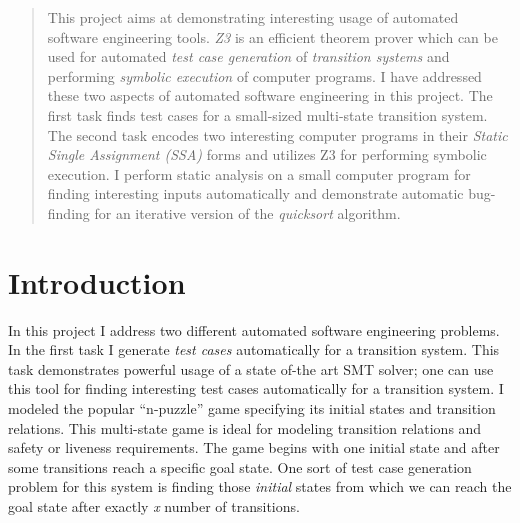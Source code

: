 \documentclass{sig-alternate-05-2015}
\begin{document}
\author{
%
%
\alignauthor
Shafiul Azam Chowdhury\\
       \\
       \\
}


\maketitle
\begin{abstract}
This project aims at demonstrating interesting usage of automated software 
engineering tools. \textit{Z3} is an efficient theorem prover \cite{DeMoura:Z3} which can be used 
for automated \textit{test case generation} of \textit{transition systems} and 
performing \textit{symbolic execution} \cite{King:SE} of computer programs. I have addressed these two aspects 
of automated software engineering in this project. The first task finds test cases for 
a small-sized multi-state transition system. The second task encodes two interesting 
computer programs in their \textit{Static Single Assignment (SSA)} \cite{Alpern:SSA} forms 
and utilizes Z3 for performing symbolic execution. I perform static analysis on a 
small computer program for finding interesting inputs automatically and demonstrate 
automatic bug-finding for an iterative version of the \textit{quicksort} algorithm. 
\end{abstract}



\section{Introduction}
In this project I address two different automated software engineering problems. In the first task I generate \textit{test cases} automatically for a transition system. This task demonstrates powerful usage of a state of-the art SMT solver; one can use this tool for finding interesting test cases automatically for a transition system. I modeled the popular ``n-puzzle'' game specifying its initial states and transition relations. This multi-state game is ideal for modeling transition relations and safety or liveness requirements. The game begins with one initial state and after some transitions reach a specific goal state. One sort of test case generation problem for this system is finding those \textit{initial} states from which we can reach the goal state after exactly \textit{x} number of transitions.
\end{document}
